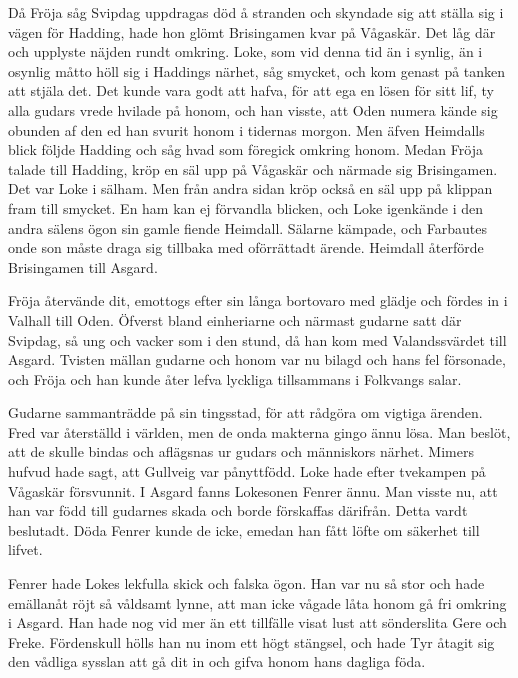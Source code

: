 Då Fröja såg Svipdag uppdragas död å stranden och skyndade sig att
ställa sig i vägen för Hadding, hade hon glömt Brisingamen kvar på
Vågaskär. Det låg där och upplyste näjden rundt omkring. Loke, som vid
denna tid än i synlig, än i osynlig måtto höll sig i Haddings närhet,
såg smycket, och kom genast på tanken att stjäla det. Det kunde vara
godt att hafva, för att ega en lösen för sitt lif, ty alla gudars vrede
hvilade på honom, och han visste, att Oden numera kände sig obunden af
den ed han svurit honom i tidernas morgon. Men äfven Heimdalls blick
följde Hadding och såg hvad som föregick omkring honom. Medan Fröja
\protect\hypertarget{lb1625905.xhtmlux5cux23start169}{}{}\protect\hypertarget{lb1625905.xhtmlux5cux23start169-a}{}{}\protect\hypertarget{lb1625905.xhtmlux5cux23start169-b}{}{}\protect\hypertarget{lb1625905.xhtmlux5cux23start169-c}{}{}\protect\hypertarget{lb1625905.xhtmlux5cux23start169-d}{}{}
talade till Hadding, kröp en säl upp på Vågaskär och närmade sig
Brisingamen. Det var Loke i sälham. Men från andra sidan kröp också en
säl upp på klippan fram till smycket. En ham kan ej förvandla blicken,
och Loke igenkände i den andra sälens ögon sin gamle fiende Heimdall.
Sälarne kämpade, och Farbautes onde son måste draga sig tillbaka med
oförrättadt ärende. Heimdall återförde Brisingamen till Asgard.

Fröja återvände dit, emottogs efter sin långa bortovaro med glädje och
fördes in i Valhall till Oden. Öfverst bland einheriarne och närmast
gudarne satt där Svipdag, så ung och vacker som i den stund, då han kom
med Valandssvärdet till Asgard. Tvisten mällan gudarne och honom var nu
bilagd och hans fel försonade, och Fröja och han kunde åter lefva
lyckliga tillsammans i Folkvangs salar.

Gudarne sammanträdde på sin tingsstad, för att rådgöra om vigtiga
ärenden. Fred var återställd i världen, men de onda makterna gingo ännu
lösa. Man beslöt, att de skulle bindas och aflägsnas ur gudars och
människors närhet. Mimers hufvud hade sagt, att Gullveig var pånyttfödd.
Loke hade efter tvekampen på Vågaskär försvunnit. I Asgard fanns
Lokesonen Fenrer ännu. Man visste nu, att han var född till gudarnes
skada och borde förskaffas därifrån. Detta vardt beslutadt. Döda Fenrer
kunde de icke, emedan han fått löfte om säkerhet till lifvet.

Fenrer hade Lokes lekfulla skick och falska ögon. Han var nu så stor och
hade emällanåt röjt så våldsamt lynne, att man icke vågade låta honom gå
fri omkring i Asgard. Han hade nog vid mer än ett tillfälle visat lust
att sönderslita Gere och Freke. Fördenskull hölls han nu inom ett högt
stängsel, och hade Tyr åtagit sig den vådliga sysslan att gå dit in och
gifva honom hans dagliga föda.

